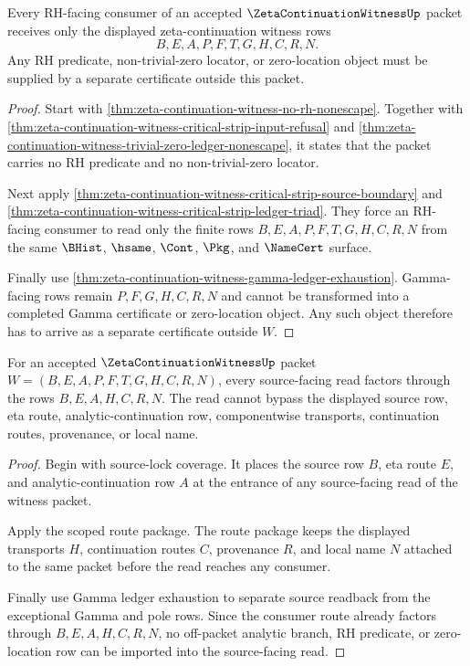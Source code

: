 \begin{theorem}
\label{thm:zeta-continuation-witness-rh-boundary-exhaustion}
Every RH-facing consumer of an accepted $\ZetaContinuationWitnessUp$ packet receives only the displayed zeta-continuation witness rows
$$
B,E,A,P,F,T,G,H,C,R,N.
$$
Any RH predicate, non-trivial-zero locator, or zero-location object must be supplied by a separate certificate outside this packet.
\end{theorem}
\begin{proof}
Start with \autoref{thm:zeta-continuation-witness-no-rh-nonescape}. Together with \autoref{thm:zeta-continuation-witness-critical-strip-input-refusal} and \autoref{thm:zeta-continuation-witness-trivial-zero-ledger-nonescape}, it states that the packet carries no RH predicate and no non-trivial-zero locator.

Next apply \autoref{thm:zeta-continuation-witness-critical-strip-source-boundary} and \autoref{thm:zeta-continuation-witness-critical-strip-ledger-triad}. They force an RH-facing consumer to read only the finite rows $B,E,A,P,F,T,G,H,C,R,N$ from the same $\BHist$, $\hsame$, $\Cont$, $\Pkg$, and $\NameCert$ surface.

Finally use \autoref{thm:zeta-continuation-witness-gamma-ledger-exhaustion}. Gamma-facing rows remain $P,F,G,H,C,R,N$ and cannot be transformed into a completed Gamma certificate or zero-location object. Any such object therefore has to arrive as a separate certificate outside $W$.
\end{proof}

\begin{theorem}
\label{thm:zeta-continuation-witness-source-scoped-readback}
For an accepted $\ZetaContinuationWitnessUp$ packet $W=(B,E,A,P,F,T,G,H,C,R,N)$, every source-facing read factors through the rows $B,E,A,H,C,R,N$. The read cannot bypass the displayed source row, eta route, analytic-continuation row, componentwise transports, continuation routes, provenance, or local name.
\end{theorem}
\begin{proof}
Begin with source-lock coverage. It places the source row $B$, eta route $E$, and analytic-continuation row $A$ at the entrance of any source-facing read of the witness packet.

Apply the scoped route package. The route package keeps the displayed transports $H$, continuation routes $C$, provenance $R$, and local name $N$ attached to the same packet before the read reaches any consumer.

Finally use Gamma ledger exhaustion to separate source readback from the exceptional Gamma and pole rows. Since the consumer route already factors through $B,E,A,H,C,R,N$, no off-packet analytic branch, RH predicate, or zero-location row can be imported into the source-facing read.
\end{proof}

